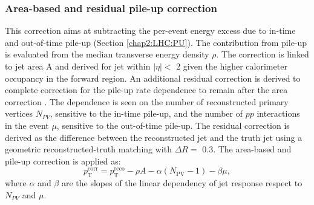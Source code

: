\subsubsection{Area-based and residual pile-up correction}
\label{Jet:Cal:chain:AreaPU}
This correction aims at subtracting the per-event energy excess due to in-time and out-of-time pile-up (Section \ref{chap2:LHC:PU}). The contribution from pile-up is evaluated from the median transverse energy density $\rho$. The correction is linked to jet area A and derived for jet within $|\eta|<$ 2 given the higher calorimeter occupancy in the forward region. An additional residual correction is derived to complete correction for the pile-up rate dependence to remain after the area correction \cite{PileUp_Sub}. The dependence is seen on the number of reconstructed primary vertices $N_{PV}$, sensitive to the in-time pile-up, and the number of $pp$ interactions in the event $\mu$, sensitive to the out-of-time pile-up. The residual correction is derived as the difference between the reconstructed jet \pT and the truth jet \pT using a geometric reconstructed-truth matching with $\Delta R= $ 0.3. The area-based and pile-up correction is applied as:
\begin{equation}
    p_{\mathrm{T}}^{\mathrm{corr}}=p_{\mathrm{T}}^{\mathrm{reco}}-\rho A-\alpha\left(N_{\mathrm{PV}}-1\right)-\beta \mu,
\end{equation}
where $\alpha$ and $\beta$ are the slopes of the linear dependency of jet response respect to $N_{PV}$ and $\mu$.

